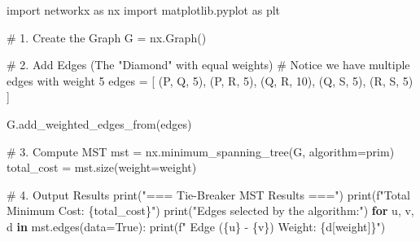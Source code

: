 \documentclass[
  letterpaper,
  DIV=11,
  numbers=noendperiod]{scrreprt}
\newenvironment{Shaded}{\begin{snugshade}}{\end{snugshade}}
\newcommand{\BuiltInTok}[1]{\textcolor[rgb]{0.00,0.23,0.31}{#1}}
\newcommand{\CommentTok}[1]{\textcolor[rgb]{0.37,0.37,0.37}{#1}}
\newcommand{\ControlFlowTok}[1]{\textcolor[rgb]{0.00,0.23,0.31}{\textbf{#1}}}
\newcommand{\DecValTok}[1]{\textcolor[rgb]{0.68,0.00,0.00}{#1}}
\newcommand{\ImportTok}[1]{\textcolor[rgb]{0.00,0.46,0.62}{#1}}
\newcommand{\KeywordTok}[1]{\textcolor[rgb]{0.00,0.23,0.31}{\textbf{#1}}}
\newcommand{\NormalTok}[1]{\textcolor[rgb]{0.00,0.23,0.31}{#1}}
\newcommand{\OperatorTok}[1]{\textcolor[rgb]{0.37,0.37,0.37}{#1}}
\newcommand{\SpecialCharTok}[1]{\textcolor[rgb]{0.37,0.37,0.37}{#1}}
\newcommand{\SpecialStringTok}[1]{\textcolor[rgb]{0.13,0.47,0.30}{#1}}
\newcommand{\StringTok}[1]{\textcolor[rgb]{0.13,0.47,0.30}{#1}}
\newcommand{\VariableTok}[1]{\textcolor[rgb]{0.07,0.07,0.07}{#1}}
\begin{document}
\begin{Shaded}
\begin{Highlighting}[]
\ImportTok{import}\NormalTok{ networkx }\ImportTok{as}\NormalTok{ nx}
\ImportTok{import}\NormalTok{ matplotlib.pyplot }\ImportTok{as}\NormalTok{ plt}

\CommentTok{\# 1. Create the Graph}
\NormalTok{G }\OperatorTok{=}\NormalTok{ nx.Graph()}

\CommentTok{\# 2. Add Edges (The "Diamond" with equal weights)}
\CommentTok{\# Notice we have multiple edges with weight 5}
\NormalTok{edges }\OperatorTok{=}\NormalTok{ [}
\NormalTok{    (}\StringTok{\textquotesingle{}P\textquotesingle{}}\NormalTok{, }\StringTok{\textquotesingle{}Q\textquotesingle{}}\NormalTok{, }\DecValTok{5}\NormalTok{),}
\NormalTok{    (}\StringTok{\textquotesingle{}P\textquotesingle{}}\NormalTok{, }\StringTok{\textquotesingle{}R\textquotesingle{}}\NormalTok{, }\DecValTok{5}\NormalTok{),}
\NormalTok{    (}\StringTok{\textquotesingle{}Q\textquotesingle{}}\NormalTok{, }\StringTok{\textquotesingle{}R\textquotesingle{}}\NormalTok{, }\DecValTok{10}\NormalTok{),}
\NormalTok{    (}\StringTok{\textquotesingle{}Q\textquotesingle{}}\NormalTok{, }\StringTok{\textquotesingle{}S\textquotesingle{}}\NormalTok{, }\DecValTok{5}\NormalTok{),}
\NormalTok{    (}\StringTok{\textquotesingle{}R\textquotesingle{}}\NormalTok{, }\StringTok{\textquotesingle{}S\textquotesingle{}}\NormalTok{, }\DecValTok{5}\NormalTok{)}
\NormalTok{]}

\NormalTok{G.add\_weighted\_edges\_from(edges)}

\CommentTok{\# 3. Compute MST}
\NormalTok{mst }\OperatorTok{=}\NormalTok{ nx.minimum\_spanning\_tree(G, algorithm}\OperatorTok{=}\StringTok{\textquotesingle{}prim\textquotesingle{}}\NormalTok{)}
\NormalTok{total\_cost }\OperatorTok{=}\NormalTok{ mst.size(weight}\OperatorTok{=}\StringTok{\textquotesingle{}weight\textquotesingle{}}\NormalTok{)}

\CommentTok{\# 4. Output Results}
\BuiltInTok{print}\NormalTok{(}\StringTok{"=== Tie{-}Breaker MST Results ==="}\NormalTok{)}
\BuiltInTok{print}\NormalTok{(}\SpecialStringTok{f"Total Minimum Cost: }\SpecialCharTok{\{}\NormalTok{total\_cost}\SpecialCharTok{\}}\SpecialStringTok{"}\NormalTok{)}
\BuiltInTok{print}\NormalTok{(}\StringTok{"Edges selected by the algorithm:"}\NormalTok{)}
\ControlFlowTok{for}\NormalTok{ u, v, d }\KeywordTok{in}\NormalTok{ mst.edges(data}\OperatorTok{=}\VariableTok{True}\NormalTok{):}
    \BuiltInTok{print}\NormalTok{(}\SpecialStringTok{f"  Edge (}\SpecialCharTok{\{}\NormalTok{u}\SpecialCharTok{\}}\SpecialStringTok{ {-} }\SpecialCharTok{\{}\NormalTok{v}\SpecialCharTok{\}}\SpecialStringTok{) Weight: }\SpecialCharTok{\{}\NormalTok{d[}\StringTok{\textquotesingle{}weight\textquotesingle{}}\NormalTok{]}\SpecialCharTok{\}}\SpecialStringTok{"}\NormalTok{)}


\end{Highlighting}
\end{Shaded}
\end{document}
